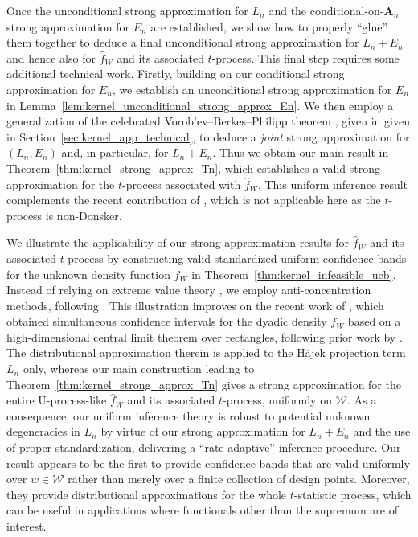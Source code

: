 \documentclass[11pt,lof]{puthesis}
\newcommand{\bA}{\ensuremath{\mathbf{A}}}
\newcommand{\cW}{\ensuremath{\mathcal{W}}}
\theoremstyle{break}
\theoremstyle{proof}
\begin{document}
Once the unconditional strong approximation for $L_n$ and the
conditional-on-$\bA_n$ strong approximation for $E_n$ are established, we show
how to properly ``glue'' them together to deduce a final unconditional strong
approximation for $L_n+E_n$ and hence also for $\hat{f}_W$ and its associated
$t$-process. This final step requires some additional technical work. Firstly,
building on our conditional strong approximation for $E_n$, we establish an
unconditional strong approximation for $E_n$ in
Lemma~\ref{lem:kernel_unconditional_strong_approx_En}.
We then employ a generalization
of the celebrated Vorob'ev--Berkes--Philipp theorem \citep{dudley1999uniform},
given in given in Section~\ref{sec:kernel_app_technical}, to deduce a
\emph{joint}
strong approximation for $(L_n,E_n)$ and, in particular, for $L_n+E_n$. Thus we
obtain our main result in Theorem~\ref{thm:kernel_strong_approx_Tn},
which establishes
a valid strong approximation for the $t$-process associated with $\hat{f}_W$.
This uniform inference result complements the recent contribution of
\citet{davezies2021exchangeable}, which is not applicable here as
the $t$-process is non-Donsker.

We illustrate the applicability of our strong approximation results for
$\hat{f}_W$ and its associated $t$-process by constructing valid standardized
uniform confidence bands for the unknown density function $f_W$
in Theorem~\ref{thm:kernel_infeasible_ucb}. Instead of
relying on extreme value theory \citep*[as in][]{gine2004kernel}, we employ
anti-concentration methods, following \citet{chernozhukov2014anti}. This
illustration improves on the recent work of \citet{chiang2022inference}, which
obtained simultaneous confidence intervals for the dyadic density $f_W$ based
on a high-dimensional central limit theorem over rectangles, following prior
work by \citet{chernozhukov2017central}. The distributional
approximation therein is applied to the H\'{a}jek projection term $L_n$ only,
whereas our main construction leading to
Theorem~\ref{thm:kernel_strong_approx_Tn}
gives a strong approximation for the entire U-process-like $\hat{f}_W$ and its
associated $t$-process, uniformly on $\cW$. As a consequence, our uniform
inference theory is robust to potential unknown degeneracies in $L_n$ by virtue
of our strong approximation for $L_n+E_n$ and the use of proper standardization,
delivering a ``rate-adaptive'' inference procedure. Our result appears to be
the first to provide confidence bands that are valid uniformly over $w \in \cW$
rather than merely over a finite collection of design points. Moreover, they
provide distributional approximations for the whole $t$-statistic process,
which can be useful in applications where functionals other than the supremum
are of interest.
\end{document}
